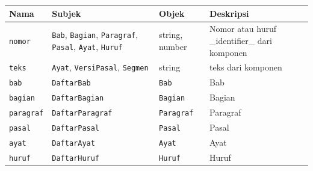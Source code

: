 \begin{longtable}{|p{}|p{}|p{}|p{}|}
  \hline
  Nama                     & Subjek                                                                                                              & Objek                                                 & Deskripsi                                         \\ \hline \endhead
  \texttt{nomor}           & \texttt{Bab}, \texttt{Bagian}, \texttt{Paragraf}, \texttt{Pasal}, \texttt{Ayat}, \texttt{Huruf}                     & string, number                                        & Nomor atau huruf \_identifier\_ dari komponen     \\ \hline
  \texttt{teks}            & \texttt{Ayat}, \texttt{VersiPasal}, \texttt{Segmen}                                                                 & string                                                & teks dari komponen                                \\ \hline
  \texttt{bab}             & \texttt{DaftarBab}                                                                                                  & \texttt{Bab}                                          & Bab                                               \\ \hline
  \texttt{bagian}          & \texttt{DaftarBagian}                                                                                               & \texttt{Bagian}                                       & Bagian                                            \\ \hline
  \texttt{paragraf}        & \texttt{DaftarParagraf}                                                                                             & \texttt{Paragraf}                                     & Paragraf                                          \\ \hline
  \texttt{pasal}           & \texttt{DaftarPasal}                                                                                                & \texttt{Pasal}                                        & Pasal                                             \\ \hline
  \texttt{ayat}            & \texttt{DaftarAyat}                                                                                                 & \texttt{Ayat}                                         & Ayat                                              \\ \hline
  \texttt{huruf}           & \texttt{DaftarHuruf}                                                                                                & \texttt{Huruf}                                        & Huruf                                             \\ \hline

\end{longtable}
